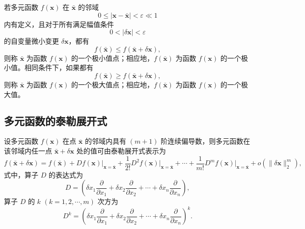 若多元函数 $f(\boldsymbol{x})$ 在 $\bar{\boldsymbol{x}}$ 的邻域
\begin{equation}\label{eq:1.11}
0 \leq |\boldsymbol{x} - \bar{\boldsymbol{x}}| < \varepsilon \ll 1
\end{equation}
内有定义，且对于所有满足幅值条件
\begin{equation}\label{eq:1.12}
0 < |\delta\boldsymbol{x}| < \varepsilon
\end{equation}
的自变量微小变更 $\delta\boldsymbol{x}$，都有
\begin{equation}\label{eq:1.13}
f(\bar{\boldsymbol{x}}) \leq f(\bar{\boldsymbol{x}} + \delta\boldsymbol{x}),
\end{equation}
则称 $\bar{\boldsymbol{x}}$ 为函数 $f(\boldsymbol{x})$ 的一个极小值点；相应地，$f(\bar{\boldsymbol{x}})$ 为函数 $f(\boldsymbol{x})$ 的一个极小值。相同条件下，如果都有
\begin{equation}\label{eq:1.14}
f(\bar{\boldsymbol{x}}) \geq f(\bar{\boldsymbol{x}} + \delta\boldsymbol{x}),
\end{equation}
则称 $\bar{\boldsymbol{x}}$ 为函数 $f(\boldsymbol{x})$ 的一个极大值点；相应地，$f(\bar{\boldsymbol{x}})$ 为函数 $f(\boldsymbol{x})$ 的一个极大值。

\subsection{多元函数的泰勒展开式}

设多元函数 $f(\boldsymbol{x})$ 在点 $\bar{\boldsymbol{x}}$ 的邻域内具有 $(m+1)$ 阶连续偏导数，则多元函数在该邻域内任一点 $\bar{\boldsymbol{x}} + \delta\boldsymbol{x}$ 处的值可由泰勒展开式表示为
\begin{equation}\label{eq:1.15}
f(\bar{\boldsymbol{x}} + \delta\boldsymbol{x}) = f(\bar{\boldsymbol{x}}) + Df(\boldsymbol{x})\big|_{\boldsymbol{x}=\bar{\boldsymbol{x}}} + \frac{1}{2!}D^2 f(\boldsymbol{x})\big|_{\boldsymbol{x}=\bar{\boldsymbol{x}}} + \cdots + \frac{1}{m!}D^m f(\boldsymbol{x})\big|_{\boldsymbol{x}=\bar{\boldsymbol{x}}} + o\!\left(\|\delta\boldsymbol{x}\|_2^m\right),
\end{equation}
式中，算子 $D$ 的表达式为
\begin{equation}\label{eq:1.16}
D = \left( \delta x_1 \frac{\partial}{\partial x_1} + \delta x_2 \frac{\partial}{\partial x_2} + \cdots + \delta x_n \frac{\partial}{\partial x_n} \right),
\end{equation}
算子 $D$ 的 $k$ $(k = 1, 2, \cdots, m)$ 次方为
\begin{equation}\label{eq:1.17}
D^k = \left( \delta x_1 \frac{\partial}{\partial x_1} + \delta x_2 \frac{\partial}{\partial x_2} + \cdots + \delta x_n \frac{\partial}{\partial x_n} \right)^{\!k}.
\end{equation}

